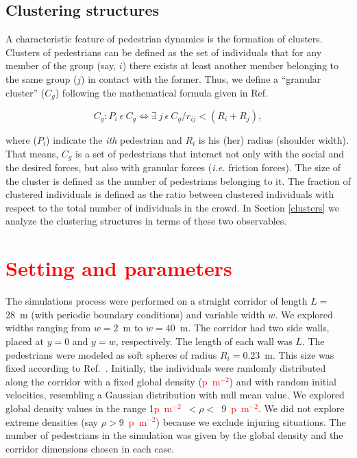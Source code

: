 \documentclass[preprint,12pt]{elsarticle}
\begin{document}
\subsection{\label{granular-cluster} Clustering structures}

A characteristic feature of pedestrian dynamics is the formation of clusters. Clusters of pedestrians can 
be defined as the set of individuals that for any member of the group (say, $i$) there exists at least another member belonging to the same group ($j$) in contact with the former. Thus, we define a ``granular cluster'' ($C_g$) following the mathematical formula given in Ref.~\cite{Dorso1}

\begin{equation}
C_g:P_i~\epsilon~ C_g \Leftrightarrow \exists~ j~\epsilon~C_g / r_{ij} < (R_i+R_j), \label{ec-cluster}
\end{equation}

where ($P_i$) indicate the \textit{ith} pedestrian and $R_i$ is his (her) radius 
(shoulder width). That means, $C_g$ is a set of pedestrians that interact not 
only with the social and the desired forces, but also with granular forces 
(\textit{i.e.} friction forces). The size of the cluster is defined as the 
number of pedestrians belonging to it. The fraction of clustered individuals is 
defined as the ratio between clustered individuals with respect to the total 
number of individuals in the crowd. In Section \ref{clusters} we analyze the 
clustering structures in terms of these two observables. \\

\section{\label{simulations}\textcolor{red}{Setting and parameters}}

The simulations process were performed on a straight corridor of length $L=$ 
28~m (with periodic boundary conditions) and variable width $w$. We explored 
widths ranging from $w=2$~m to $w=40$~m. The corridor had two side walls, placed 
at $y=0$ and $y=w$, respectively. The length of each wall was $L$. The 
pedestrians were modeled as soft spheres of radius $R_i=0.23$~m. This size was 
fixed according to Ref.~\cite{metric_handbook}. Initially, the individuals were 
randomly distributed along the corridor with a fixed global density 
(\textcolor{red}{p~m$^{-2}$}) and with random initial velocities, resembling a 
Gaussian distribution with null mean value. We explored global density values in 
the range 1\textcolor{red}{p~m$^{-2}$}~$<\rho<$~9~\textcolor{red}{p~m$^{-2}$}. 
We did not explore extreme densities (say $\rho>$9~\textcolor{red}{p~m$^{-2}$}) 
because we exclude injuring situations. The number of pedestrians in the 
simulation was given by the global density and the corridor dimensions chosen in 
each case. \\
\end{document}
